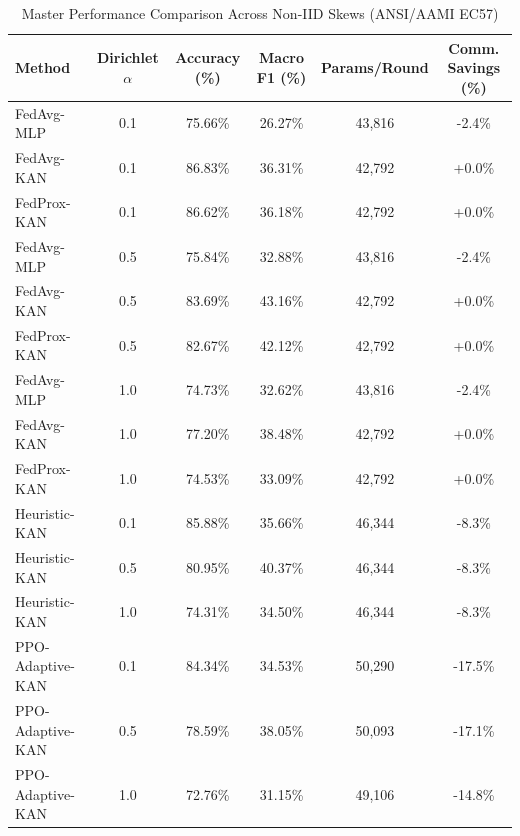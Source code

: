 \begin{table}[t]
\centering
\caption{Master Performance Comparison Across Non-IID Skews (ANSI/AAMI EC57)}
\label{tab:master_benchmark}
\small
\begin{tabular}{lccccc}
\toprule
\textbf{Method} & \textbf{Dirichlet $\alpha$} & \textbf{Accuracy (\%)} & \textbf{Macro F1 (\%)} & \textbf{Params/Round} & \textbf{Comm. Savings (\%)} \\
\midrule
FedAvg-MLP & 0.1 & 75.66\% & 26.27\% & 43,816 & -2.4\% \\
FedAvg-KAN & 0.1 & 86.83\% & 36.31\% & 42,792 & +0.0\% \\
FedProx-KAN & 0.1 & 86.62\% & 36.18\% & 42,792 & +0.0\% \\
FedAvg-MLP & 0.5 & 75.84\% & 32.88\% & 43,816 & -2.4\% \\
FedAvg-KAN & 0.5 & 83.69\% & 43.16\% & 42,792 & +0.0\% \\
FedProx-KAN & 0.5 & 82.67\% & 42.12\% & 42,792 & +0.0\% \\
FedAvg-MLP & 1.0 & 74.73\% & 32.62\% & 43,816 & -2.4\% \\
FedAvg-KAN & 1.0 & 77.20\% & 38.48\% & 42,792 & +0.0\% \\
FedProx-KAN & 1.0 & 74.53\% & 33.09\% & 42,792 & +0.0\% \\
Heuristic-KAN & 0.1 & 85.88\% & 35.66\% & 46,344 & -8.3\% \\
Heuristic-KAN & 0.5 & 80.95\% & 40.37\% & 46,344 & -8.3\% \\
Heuristic-KAN & 1.0 & 74.31\% & 34.50\% & 46,344 & -8.3\% \\
PPO-Adaptive-KAN & 0.1 & 84.34\% & 34.53\% & 50,290 & -17.5\% \\
PPO-Adaptive-KAN & 0.5 & 78.59\% & 38.05\% & 50,093 & -17.1\% \\
PPO-Adaptive-KAN & 1.0 & 72.76\% & 31.15\% & 49,106 & -14.8\% \\
\bottomrule
\end{tabular}
\end{table}